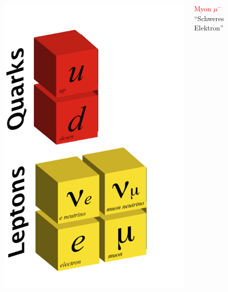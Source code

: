 \documentclass{beamer}
\begin{document}
\begin{frame}
\begin{columns}
\begin{column}{0.6\textwidth}
{\begin{columns}
\begin{column}{0.4\textwidth}
            \includegraphics[width=\textwidth]{sm/StandardModel_FirstGenerationPlusMuon.png}
          \end{column}
          \begin{column}{0.5\textwidth}
            \begin{center}
              \textcolor{red}{\Large Myon $\mu^{-}$}\\
              ``Schweres Elektron''
            \end{center}
          \end{column}
        \end{columns}
      }
    \end{column}
    \begin{column}{0.4\textwidth}

\end{column}
\end{columns}
\end{frame}
\end{document}
